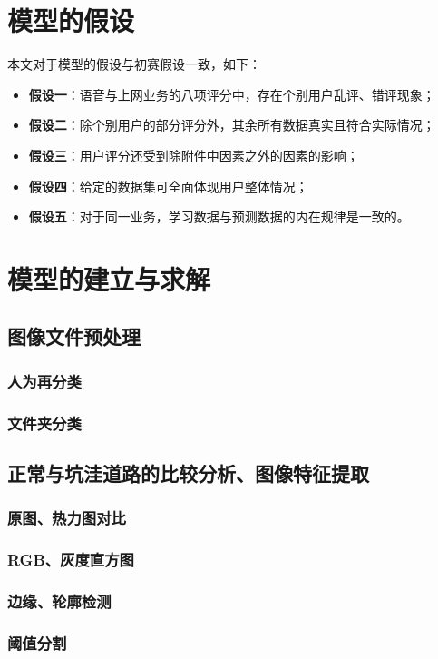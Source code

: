\documentclass{MathorCupmodeling}
\begin{document}
	\section{模型的假设}
	本文对于模型的假设与初赛假设一致，如下：
	\begin{itemize}
		\item \textbf{假设一}：语音与上网业务的八项评分中，存在个别用户乱评、错评现象；
		\item \textbf{假设二}：除个别用户的部分评分外，其余所有数据真实且符合实际情况；
		\item \textbf{假设三}：用户评分还受到除附件中因素之外的因素的影响；
		\item \textbf{假设四}：给定的数据集可全面体现用户整体情况；
		\item \textbf{假设五}：对于同一业务，学习数据与预测数据的内在规律是一致的。
	\end{itemize}
	\section{模型的建立与求解}
	\subsection{图像文件预处理}
	\subsubsection{人为再分类}
	\subsubsection{文件夹分类}
	\subsection{正常与坑洼道路的比较分析、图像特征提取}
	\subsubsection{原图、热力图对比}
	\subsubsection{RGB、灰度直方图}
	\subsubsection{边缘、轮廓检测}
	\subsubsection{阈值分割}
\end{document}

